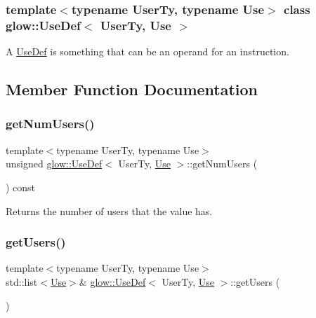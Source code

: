 \subsubsection*{template$<$typename User\+Ty, typename Use$>$\newline
class glow\+::\+Use\+Def$<$ User\+Ty, Use $>$}

A \hyperlink{classglow_1_1_use_def}{Use\+Def} is something that can be an operand for an instruction. 

\subsection{Member Function Documentation}
\mbox{\label{classglow_1_1_use_def_aee4e20812def8d2a62db301527e8e9e8}} 
\subsubsection{\texorpdfstring{get\+Num\+Users()}{getNumUsers()}}
{\footnotesize\ttfamily template$<$typename User\+Ty, typename Use$>$ \\
unsigned \hyperlink{classglow_1_1_use_def}{glow\+::\+Use\+Def}$<$ User\+Ty, \hyperlink{structglow_1_1_use}{Use} $>$\+::get\+Num\+Users (\begin{DoxyParamCaption}{ }\end{DoxyParamCaption}) const\hspace{0.3cm}{\ttfamily [inline]}}

\begin{DoxyReturn}{Returns}
the number of users that the value has. 
\end{DoxyReturn}
\mbox{\label{classglow_1_1_use_def_a36287064b16f4c2569988d2b795cd9b7}} 
\subsubsection{\texorpdfstring{get\+Users()}{getUsers()}\hspace{0.1cm}{\footnotesize\ttfamily [1/2]}}
{\footnotesize\ttfamily template$<$typename User\+Ty, typename Use$>$ \\
std\+::list$<$\hyperlink{structglow_1_1_use}{Use}$>$\& \hyperlink{classglow_1_1_use_def}{glow\+::\+Use\+Def}$<$ User\+Ty, \hyperlink{structglow_1_1_use}{Use} $>$\+::get\+Users (\begin{DoxyParamCaption}{ }\end{DoxyParamCaption})\hspace{0.3cm}{\ttfamily [inline]}}

